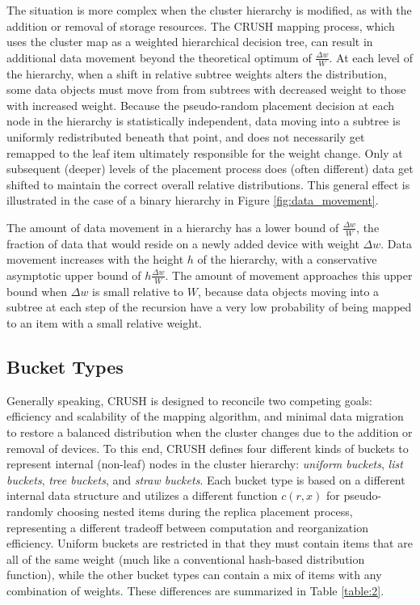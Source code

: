 \documentclass[12pt,a4paper]{report}
\begin{document}
The situation is more complex when the cluster hierarchy is modified, as with
the addition or removal of storage resources. The CRUSH mapping process, which
uses the cluster map as a weighted hierarchical decision tree, can result in
additional data movement beyond the theoretical optimum of $\frac{\Delta
w}{W}$. At each level of the hierarchy, when a shift in relative subtree
weights alters the distribution, some data objects must move from from subtrees
with decreased weight to those with increased weight. Because the pseudo-random
placement decision at each node in the hierarchy is statistically independent,
data moving into a subtree is uniformly redistributed beneath that point, and
does not necessarily get remapped to the leaf item ultimately responsible for
the weight change. Only at subsequent (deeper) levels of the placement process
does (often different) data get shifted to maintain the correct overall
relative distributions. This general effect is illustrated in the case of a
binary hierarchy in Figure \ref{fig:data_movement}.

The amount of data movement in a hierarchy has a lower bound  of $\frac{\Delta
w}{W}$, the fraction of data that would reside on a newly added device with
weight $\Delta w$. Data movement increases with the height $h$ of the
hierarchy, with a conservative asymptotic upper bound of $h \frac{\Delta
w}{W}$. The amount of movement approaches this upper bound when $\Delta w$ is
small relative to $W$, because data objects moving into a subtree at each step
of the recursion have a very low probability of being mapped to an item with a
small relative weight.

\subsection{Bucket Types}

Generally speaking, CRUSH is designed to reconcile two competing goals:
efficiency and scalability of the mapping algorithm, and minimal data migration
to restore a balanced distribution when the cluster changes due to the addition
or removal of devices. To this end, CRUSH defines four different kinds of
buckets to represent internal (non-leaf) nodes in the cluster hierarchy:
\emph{uniform buckets}, \emph{list buckets}, \emph{tree buckets}, and
\emph{straw buckets}. Each bucket type is based on a different internal data
structure and utilizes a different function $c(r, x)$ for pseudo-randomly
choosing nested items during the replica placement process, representing a
different tradeoff between computation and reorganization efficiency. Uniform
buckets are restricted in that they must contain items that are all of the same
weight (much like a conventional hash-based distribution function), while the
other bucket types can contain a mix of items with any combination of weights.
These differences are summarized in Table \ref{table:2}.
\end{document}
